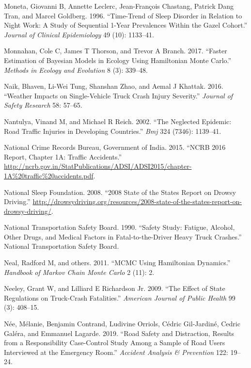 \documentclass[12pt]{book}
\numberwithin{equation}{chapter}
\begin{document}
\leavevmode\hypertarget{ref-moneta1996time}{}%
Moneta, Giovanni B, Annette Leclerc, Jean-François Chastang, Patrick Dang Tran, and Marcel Goldberg. 1996. ``Time-Trend of Sleep Disorder in Relation to Night Work: A Study of Sequential 1-Year Prevalences Within the Gazel Cohort.'' \emph{Journal of Clinical Epidemiology} 49 (10): 1133--41.

\leavevmode\hypertarget{ref-monnahan2017faster}{}%
Monnahan, Cole C, James T Thorson, and Trevor A Branch. 2017. ``Faster Estimation of Bayesian Models in Ecology Using Hamiltonian Monte Carlo.'' \emph{Methods in Ecology and Evolution} 8 (3): 339--48.

\leavevmode\hypertarget{ref-naik2016weather}{}%
Naik, Bhaven, Li-Wei Tung, Shanshan Zhao, and Aemal J Khattak. 2016. ``Weather Impacts on Single-Vehicle Truck Crash Injury Severity.'' \emph{Journal of Safety Research} 58: 57--65.

\leavevmode\hypertarget{ref-nantulya2002neglected}{}%
Nantulya, Vinand M, and Michael R Reich. 2002. ``The Neglected Epidemic: Road Traffic Injuries in Developing Countries.'' \emph{Bmj} 324 (7346): 1139--41.

\leavevmode\hypertarget{ref-india2015}{}%
National Crime Records Bureau, Government of India. 2015. ``NCRB 2016 Report, Chapter 1A: Traffic Accidents.'' \url{http://ncrb.gov.in/StatPublications/ADSI/ADSI2015/chapter-1A\%20traffic\%20accidents.pdf}.

\leavevmode\hypertarget{ref-nsleepf}{}%
National Sleep Foundation. 2008. ``2008 State of the States Report on Drowsy Driving.'' \url{http://drowsydriving.org/resources/2008-state-of-the-states-report-on-drowsy-driving/}.

\leavevmode\hypertarget{ref-ntsb1990}{}%
National Transportation Safety Board. 1990. ``Safety Study: Fatigue, Alcohol, Other Drugs, and Medical Factors in Fatal-to-the-Driver Heavy Truck Crashes.'' National Transportation Safety Board.

\leavevmode\hypertarget{ref-neal2011mcmc}{}%
Neal, Radford M, and others. 2011. ``MCMC Using Hamiltonian Dynamics.'' \emph{Handbook of Markov Chain Monte Carlo} 2 (11): 2.

\leavevmode\hypertarget{ref-neeley2009effect}{}%
Neeley, Grant W, and Lilliard E Richardson Jr. 2009. ``The Effect of State Regulations on Truck-Crash Fatalities.'' \emph{American Journal of Public Health} 99 (3): 408--15.

\leavevmode\hypertarget{ref-nee2019road}{}%
Née, Mélanie, Benjamin Contrand, Ludivine Orriols, Cédric Gil-Jardiné, Cedric Galéra, and Emmanuel Lagarde. 2019. ``Road Safety and Distraction, Results from a Responsibility Case-Control Study Among a Sample of Road Users Interviewed at the Emergency Room.'' \emph{Accident Analysis \& Prevention} 122: 19--24.
\end{document}
